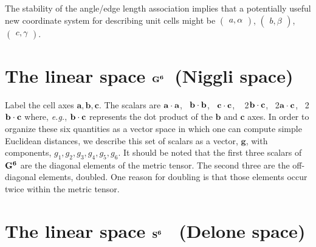 \documentclass[preprint]{iucr}              %
\numberwithin{equation}{section}
\newcommand{\SVI}[0]{$\bf{S^{6}}$}
\newcommand{\GVI}[0]{$\bf{G^{6}}$}
\newcommand{\vdotv}[2]{${{\bf #1 \cdot #2}}$}
\begin{document}
The stability of the angle/edge length association implies
that a potentially  useful new coordinate system for describing unit cells 
might be $\begin{pmatrix} a,\alpha \end{pmatrix}$, 
 $\begin{pmatrix} b,\beta \end{pmatrix}$,  
 $\begin{pmatrix} c,\gamma \end{pmatrix}$.

\section{The linear space \GVI ~(Niggli space)}
\label{G6}

			Label  the cell axes ${\textbf{a}, \textbf{b}, \textbf{c}}$. The scalars are	\vdotv{\textbf{a}}{\textbf{a}},~ \vdotv{\textbf{b}}{\textbf{b}},~ \vdotv{\textbf{c}}{\textbf{c}},
			~ 2\vdotv{\textbf{b}}{\textbf{c}},~ 2\vdotv{\textbf{a}}{\textbf{c}},~ 2\vdotv{\textbf{b}}{\textbf{c}} where,
			{\it e.g.},
			\vdotv{\textbf{b}}{\textbf{c}} represents the dot product of the ${\textbf{b}}$  and ${\textbf{c}}$  axes. In order to organize these six quantities as a vector space in which one
			can compute simple Euclidean distances, we describe this set of scalars 
			as a vector, ${\textbf{g}}$, with components, $ {g}_1, {g}_2, {g}_3, {g}_4, {g}_5, {g}_6 $. \cite{Andrews2014}
		It should be noted that the first three scalars of \GVI{} are the
		 diagonal elements of the metric tensor. The second three are the 
		 off-diagonal elements, doubled. One reason for doubling is that those
		 elements occur twice within the metric tensor.

\section{The linear space \SVI{}~ (Delone space)}
\label{S6}
\end{document}
